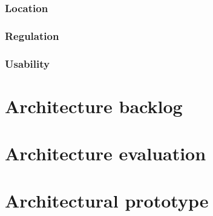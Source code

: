 \documentclass[a4paper,11pt]{report}
\begin{document}
\subsection{Location}
\label{sec:location}


\subsection{Regulation}
\label{sec:regulation}


\subsection{Usability}
\label{sec:usability}


\appendix

\chapter{Architecture backlog}
\label{cha:architecture-backlog}
\thispagestyle{fancy}


\chapter{Architecture evaluation}
\label{cha:arch-eval}
\thispagestyle{fancy}


\chapter{Architectural prototype}
\label{cha:arch-prot}
\thispagestyle{fancy}





%
%


\end{document}
